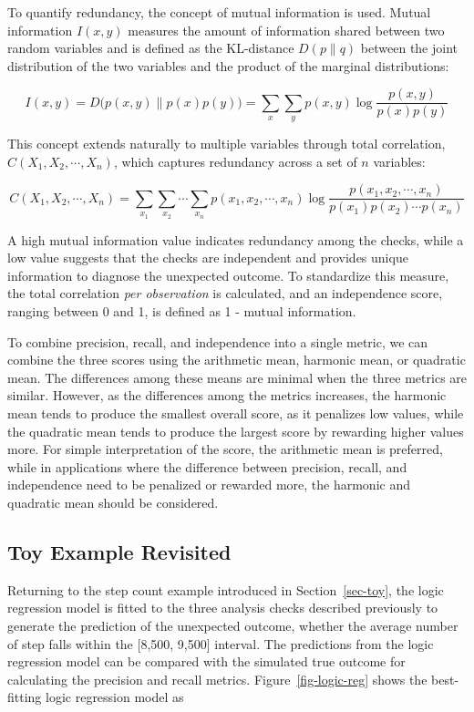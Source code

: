 \documentclass[
  12pt,
]{interact}
\begin{document}
To quantify redundancy, the concept of mutual information is used.
Mutual information \(I(x, y)\) measures the amount of information shared
between two random variables and is defined as the KL-distance
\(D(p \parallel q)\) between the joint distribution of the two variables
and the product of the marginal distributions:

\[I(x,y) = D\big(p(x,y) \parallel p(x)p(y)\big) = \sum_x \sum_y p(x,y) \log \frac{p(x,y)}{p(x)p(y)}\]

This concept extends naturally to multiple variables through total
correlation, \(C(X_1, X_2, \cdots, X_n)\), which captures redundancy
across a set of \(n\) variables:

\[C(X_1, X_2, \cdots, X_n) = \sum_{x_1} \sum_{x_2} \cdots \sum_{x_n} p(x_1, x_2, \cdots, x_n) \log \frac{p(x_1, x_2, \cdots, x_n)}{p(x_1)p(x_2) \cdots p(x_n)}\]

A high mutual information value indicates redundancy among the checks,
while a low value suggests that the checks are independent and provides
unique information to diagnose the unexpected outcome. To standardize
this measure, the total correlation \emph{per observation} is
calculated, and an independence score, ranging between 0 and 1, is
defined as 1 - mutual information.

To combine precision, recall, and independence into a single metric, we
can combine the three scores using the arithmetic mean, harmonic mean,
or quadratic mean. The differences among these means are minimal when
the three metrics are similar. However, as the differences among the
metrics increases, the harmonic mean tends to produce the smallest
overall score, as it penalizes low values, while the quadratic mean
tends to produce the largest score by rewarding higher values more. For
simple interpretation of the score, the arithmetic mean is preferred,
while in applications where the difference between precision, recall,
and independence need to be penalized or rewarded more, the harmonic and
quadratic mean should be considered.

\subsection{Toy Example Revisited}\label{toy-example-revisited}

Returning to the step count example introduced in Section~\ref{sec-toy},
the logic regression model is fitted to the three analysis checks
described previously to generate the prediction of the unexpected
outcome, whether the average number of step falls within the {[}8,500,
9,500{]} interval. The predictions from the logic regression model can
be compared with the simulated true outcome for calculating the
precision and recall metrics. Figure~\ref{fig-logic-reg} shows the
best-fitting logic regression model as
\end{document}
